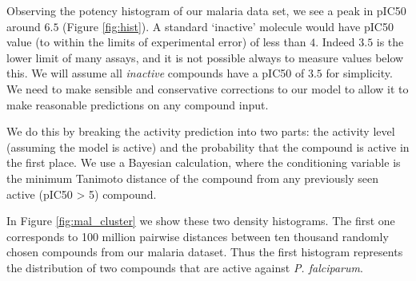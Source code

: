 \documentclass{article}
\begin{document}
Observing the potency histogram of our malaria data set, we see a peak in pIC50 around $6.5$ (Figure \ref{fig:hist}).  A standard `inactive' molecule would have pIC50 value (to within the limits of experimental error) of less than $4$.  Indeed $3.5$ is the lower limit of many assays, and it is not possible always to measure values below this.  We will assume all \textit{inactive} compounds have a pIC50 of $3.5$ for simplicity.
\newline
\newline
We need to make sensible and conservative corrections to our model to allow it to make reasonable predictions on any compound input.  

We do this by breaking the activity prediction into two parts: the activity level (assuming the model is active) and the probability that the compound is active in the first place.  We use a Bayesian calculation, where the conditioning variable is the minimum Tanimoto distance of the compound from any previously seen active (pIC50 > 5) compound.

In Figure \ref{fig:mal_cluster} we show these two density histograms. 
The first one corresponds to 100 million pairwise distances between ten thousand randomly chosen compounds from our malaria dataset.  Thus the first histogram represents the distribution of two compounds that are active against {\it P. falciparum}.
\end{document}
